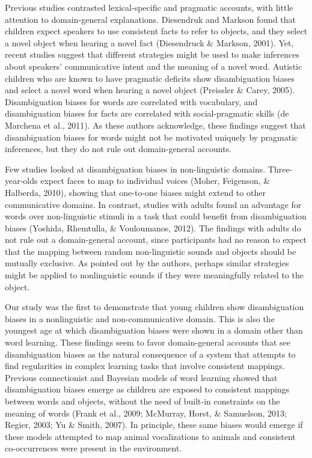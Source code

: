 \documentclass[english,floatsintext,man]{apa6}
\newcounter{author}
\theoremstyle{definition}
\theoremstyle{definition}
\theoremstyle{definition}
\theoremstyle{remark}
\begin{document}
Previous studies contrasted lexical-specific and pragmatic accounts,
with little attention to domain-general explanations. Diesendruk and
Markson found that children expect speakers to use consistent facts to
refer to objects, and they select a novel object when hearing a novel
fact (Diesendruck \& Markson, 2001). Yet, recent studies suggest that
different strategies might be used to make inferences about speakers'
communicative intent and the meaning of a novel word. Autistic children
who are known to have pragmatic deficits show disambiguation biases and
select a novel word when hearing a novel object (Preissler \& Carey,
2005). Disambiguation biases for words are correlated with vocabulary,
and disambiguation biases for facts are correlated with social-pragmatic
skills (de Marchena et al., 2011). As these authors acknowledge, these
findings suggest that disambiguation biases for words might not be
motivated uniquely by pragmatic inferences, but they do not rule out
domain-general accounts.

Few studies looked at disambiguation biases in non-linguistic domains.
Three-year-olds expect faces to map to individual voices (Moher,
Feigenson, \& Halberda, 2010), showing that one-to-one biases might
extend to other communicative domains. In contrast, studies with adults
found an advantage for words over non-linguistic stimuli in a task that
could benefit from disambiguation biases (Yoshida, Rhemtulla, \&
Vouloumanos, 2012). The findings with adults do not rule out a
domain-general account, since participants had no reason to expect that
the mapping between random non-linguistic sounds and objects should be
mutually exclusive. As pointed out by the authors, perhaps similar
strategies might be applied to nonlinguistic sounds if they were
meaningfully related to the object.

Our study was the first to demonstrate that young children show
disambiguation biases in a nonlinguistic and non-communicative domain.
This is also the youngest age at which disambiguation biases were shown
in a domain other than word learning. These findings seem to favor
domain-general accounts that see disambiguation biases as the natural
consequence of a system that attempts to find regularities in complex
learning tasks that involve consistent mappings. Previous connectionist
and Bayesian models of word learning showed that disambiguation biases
emerge as children are exposed to consistent mappings between words and
objects, without the need of built-in constraints on the meaning of
words (Frank et al., 2009; McMurray, Horst, \& Samuelson, 2013; Regier,
2003; Yu \& Smith, 2007). In principle, these same biases would emerge
if these models attempted to map animal vocalizations to animals and
consistent co-occurrences were present in the environment.
\end{document}
